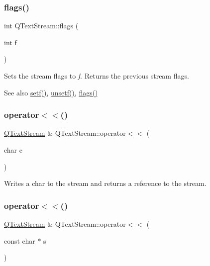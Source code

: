 \subsubsection{\texorpdfstring{flags()}{flags()}\hspace{0.1cm}{\footnotesize\ttfamily [2/2]}}
{\footnotesize\ttfamily int Q\+Text\+Stream\+::flags (\begin{DoxyParamCaption}\item[{int}]{f }\end{DoxyParamCaption})\hspace{0.3cm}{\ttfamily [inline]}}

Sets the stream flags to {\itshape f}. Returns the previous stream flags.

\begin{DoxySeeAlso}{See also}
\mbox{\hyperlink{class_q_text_stream_adb71ee168e670b470bcbc547b994c5df}{setf()}}, \mbox{\hyperlink{class_q_text_stream_a7f7cb71e79749c7d13217dec5599e627}{unsetf()}}, \mbox{\hyperlink{class_q_text_stream_ab6cf395446ba04973dff067ab8b36978}{flags()}} 
\end{DoxySeeAlso}
\mbox{\label{class_q_text_stream_aa4ca816ce1b8a1cb25e3d9dfc1d7c4df}} 
\subsubsection{\texorpdfstring{operator$<$$<$()}{operator<<()}\hspace{0.1cm}{\footnotesize\ttfamily [1/14]}}
{\footnotesize\ttfamily \mbox{\hyperlink{class_q_text_stream}{Q\+Text\+Stream}} \& Q\+Text\+Stream\+::operator$<$$<$ (\begin{DoxyParamCaption}\item[{char}]{c }\end{DoxyParamCaption})}

Writes a {\ttfamily char} to the stream and returns a reference to the stream. \mbox{\label{class_q_text_stream_a7c02cd21c226d98bfb1dc18851f500a9}} 
\subsubsection{\texorpdfstring{operator$<$$<$()}{operator<<()}\hspace{0.1cm}{\footnotesize\ttfamily [2/14]}}
{\footnotesize\ttfamily \mbox{\hyperlink{class_q_text_stream}{Q\+Text\+Stream}} \& Q\+Text\+Stream\+::operator$<$$<$ (\begin{DoxyParamCaption}\item[{const char $\ast$}]{s }\end{DoxyParamCaption})}


